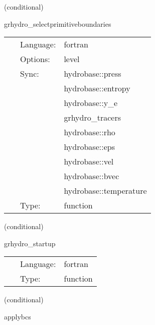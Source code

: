 \documentclass{article}
\begin{document}
\vspace{5mm}

   (conditional) 

\hspace{5mm} grhydro\_selectprimitiveboundaries 

\hspace{5mm}{\it select primitive variables for boundary conditions } 


\hspace{5mm}

 \begin{tabular*}{160mm}{cll} 
~ & Language:  & fortran \\ 
~ & Options:  & level \\ 
~ & Sync:  & hydrobase::press \\ 
~& ~ &hydrobase::entropy\\ 
~& ~ &hydrobase::y\_e\\ 
~& ~ &grhydro\_tracers\\ 
~& ~ &hydrobase::rho\\ 
~& ~ &hydrobase::eps\\ 
~& ~ &hydrobase::vel\\ 
~& ~ &hydrobase::bvec\\ 
~& ~ &hydrobase::temperature\\ 
~ & Type:  & function \\ 
\end{tabular*} 


\vspace{5mm}

   (conditional) 

\hspace{5mm} grhydro\_startup 

\hspace{5mm}{\it startup banner } 


\hspace{5mm}

 \begin{tabular*}{160mm}{cll} 
~ & Language:  & fortran \\ 
~ & Type:  & function \\ 
\end{tabular*} 


\vspace{5mm}

   (conditional) 

\hspace{5mm} applybcs 
\end{document}
